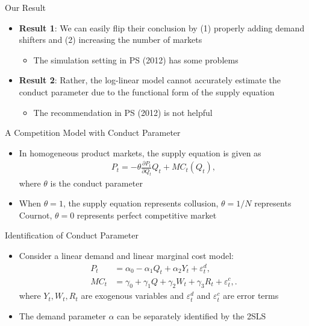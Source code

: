\documentclass[aspectratio = 169]{beamer}
\theoremstyle{definition}
\begin{document}
\begin{frame}{Our Result}
    \begin{itemize}
        \item \textbf{Result 1}: We can easily flip their conclusion by (1) properly adding demand shifters and (2) increasing the number of markets
        \begin{itemize}
            \item The simulation setting in PS (2012) has some problems
        \end{itemize}
        \item \textbf{Result 2}: Rather, the log-linear model cannot accurately estimate the conduct parameter due to the functional form of the supply equation
        \begin{itemize}
            \item The recommendation in PS (2012) is not helpful
        \end{itemize}
    \end{itemize}
\end{frame}


\begin{frame}{A Competition Model with Conduct Parameter}
    \begin{itemize}
        \item In homogeneous product markets, the supply equation is given as
        \begin{align*}
            P_t = -\theta\frac{\partial P_t}{\partial Q_t}Q_t + MC_t(Q_t),
        \end{align*}
        where $\theta$ is the conduct parameter
        \item When $\theta = 1$, the supply equation represents collusion, $\theta = 1/N$ represents Cournot, $\theta =0$ represents perfect competitive market
    \end{itemize}
\end{frame}




\begin{frame}{Identification of Conduct Parameter}
    \begin{itemize}
        \item Consider a linear demand and linear marginal cost model:
        \begin{align}
            P_t &= \alpha_0 - \alpha_1 Q_t + \alpha_2 Y_t + \varepsilon^{d}_{t},\label{eq:linear_demand}\\
            MC_t &= \gamma_0  + \gamma_1 Q + \gamma_2 W_{t} + \gamma_3 R_t + \varepsilon^{c}_{t},\label{eq:linear_marginal_cost}.
        \end{align}
        where $Y_t, W_t, R_t$ are exogenous variables and $\varepsilon^{d}_{t}$ and $\varepsilon^{c}_{t}$ are error terms
        \item The demand parameter $\alpha$ can be separately identified by the 2SLS
    \end{itemize}
\end{frame}
\end{document}
